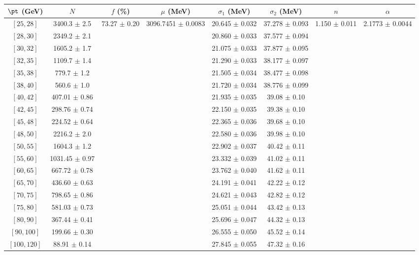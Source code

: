 \begin{tabular}{c||c|c|c|c|c|c|c}
$\pt$ (GeV) & $N$ & $f$ (\%) & $\mu$ (MeV) & $\sigma_1$ (MeV) & $\sigma_2$ (MeV) & $n$ & $\alpha$ \\
\hline
$[25, 28]$ & 3400.3 $\pm$ 2.5 & \multirow{19}{*}{73.27 $\pm$ 0.20} & \multirow{19}{*}{3096.7451 $\pm$ 0.0083} & 20.645 $\pm$ 0.032 & 37.278 $\pm$ 0.093 & \multirow{19}{*}{1.150 $\pm$ 0.011} & \multirow{19}{*}{2.1773 $\pm$ 0.0044}\\
$[28, 30]$ & 2349.2 $\pm$ 2.1 &  &  & 20.860 $\pm$ 0.033 & 37.577 $\pm$ 0.094 &  & \\
$[30, 32]$ & 1605.2 $\pm$ 1.7 &  &  & 21.075 $\pm$ 0.033 & 37.877 $\pm$ 0.095 &  & \\
$[32, 35]$ & 1109.7 $\pm$ 1.4 &  &  & 21.290 $\pm$ 0.033 & 38.177 $\pm$ 0.097 &  & \\
$[35, 38]$ & 779.7 $\pm$ 1.2 &  &  & 21.505 $\pm$ 0.034 & 38.477 $\pm$ 0.098 &  & \\
$[38, 40]$ & 560.6 $\pm$ 1.0 &  &  & 21.720 $\pm$ 0.034 & 38.776 $\pm$ 0.099 &  & \\
$[40, 42]$ & 407.01 $\pm$ 0.86 &  &  & 21.935 $\pm$ 0.035 & 39.08 $\pm$ 0.10 &  & \\
$[42, 45]$ & 298.76 $\pm$ 0.74 &  &  & 22.150 $\pm$ 0.035 & 39.38 $\pm$ 0.10 &  & \\
$[45, 48]$ & 224.52 $\pm$ 0.64 &  &  & 22.365 $\pm$ 0.036 & 39.68 $\pm$ 0.10 &  & \\
$[48, 50]$ & 2216.2 $\pm$ 2.0 &  &  & 22.580 $\pm$ 0.036 & 39.98 $\pm$ 0.10 &  & \\
$[50, 55]$ & 1604.3 $\pm$ 1.2 &  &  & 22.902 $\pm$ 0.037 & 40.42 $\pm$ 0.11 &  & \\
$[55, 60]$ & 1031.45 $\pm$ 0.97 &  &  & 23.332 $\pm$ 0.039 & 41.02 $\pm$ 0.11 &  & \\
$[60, 65]$ & 667.72 $\pm$ 0.78 &  &  & 23.762 $\pm$ 0.040 & 41.62 $\pm$ 0.11 &  & \\
$[65, 70]$ & 436.60 $\pm$ 0.63 &  &  & 24.191 $\pm$ 0.041 & 42.22 $\pm$ 0.12 &  & \\
$[70, 75]$ & 798.65 $\pm$ 0.86 &  &  & 24.621 $\pm$ 0.043 & 42.82 $\pm$ 0.12 &  & \\
$[75, 80]$ & 581.03 $\pm$ 0.73 &  &  & 25.051 $\pm$ 0.044 & 43.42 $\pm$ 0.13 &  & \\
$[80, 90]$ & 367.44 $\pm$ 0.41 &  &  & 25.696 $\pm$ 0.047 & 44.32 $\pm$ 0.13 &  & \\
$[90, 100]$ & 199.66 $\pm$ 0.30 &  &  & 26.555 $\pm$ 0.050 & 45.52 $\pm$ 0.14 &  & \\
$[100, 120]$ & 88.91 $\pm$ 0.14 &  &  & 27.845 $\pm$ 0.055 & 47.32 $\pm$ 0.16 &  & \\
\end{tabular}
